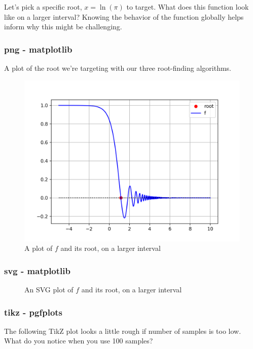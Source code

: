 \documentclass{article}
\begin{document}
Let's pick a specific root, $x=\ln(\pi)$ to target. What does this function
look like on a larger interval? Knowing the behavior of the function globally
helps inform why this might be challenging.

\subsubsection{png - matplotlib}

A plot of the root we're targeting with our three root-finding algorithms.


\begin{figure}[h]
  \centering
  \includegraphics[scale=0.8]{./plots/ffull}
  \caption{A plot of $f$ and its root, on a larger interval}
\end{figure}

\subsubsection{svg - matplotlib}

\begin{figure}[h]
  \centering
  \caption{An SVG plot of $f$ and its root, on a larger interval}
\end{figure}

\subsubsection{tikz - pgfplots}


The following TikZ plot looks a little rough if number of samples
is too low. What do you notice when you use 100 samples?
\end{document}
